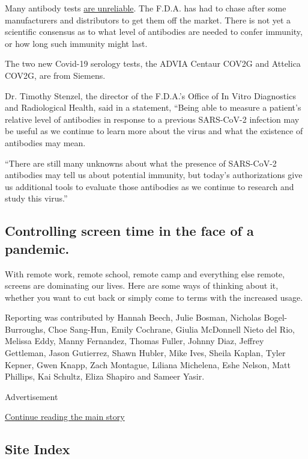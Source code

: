 Many antibody tests
\href{https://www.nytimes.com/2020/05/04/health/fda-antibody-tests-coronavirus.html}{are
unreliable}. The F.D.A. has had to chase after some manufacturers and
distributors to get them off the market. There is not yet a scientific
consensus as to what level of antibodies are needed to confer immunity,
or how long such immunity might last.

The two new Covid-19 serology tests, the ADVIA Centaur COV2G and
Attelica COV2G, are from Siemens.

Dr. Timothy Stenzel, the director of the F.D.A.'s Office of In Vitro
Diagnostics and Radiological Health, said in a statement, ``Being able
to measure a patient's relative level of antibodies in response to a
previous SARS-CoV-2 infection may be useful as we continue to learn more
about the virus and what the existence of antibodies may mean.

``There are still many unknowns about what the presence of SARS-CoV-2
antibodies may tell us about potential immunity, but today's
authorizations give us additional tools to evaluate those antibodies as
we continue to research and study this virus.''

\hypertarget{controlling-screen-time-in-the-face-of-a-pandemic}{%
\subsection{Controlling screen time in the face of a
pandemic.}\label{controlling-screen-time-in-the-face-of-a-pandemic}}

With remote work, remote school, remote camp and everything else remote,
screens are dominating our lives. Here are some ways of thinking about
it, whether you want to cut back or simply come to terms with the
increased usage.

Reporting was contributed by Hannah Beech, Julie Bosman, Nicholas
Bogel-Burroughs, Choe Sang-Hun, Emily Cochrane, Giulia McDonnell Nieto
del Rio, Melissa Eddy, Manny Fernandez, Thomas Fuller, Johnny Diaz,
Jeffrey Gettleman, Jason Gutierrez, Shawn Hubler, Mike Ives, Sheila
Kaplan, Tyler Kepner, Gwen Knapp, Zach Montague, Liliana Michelena, Eshe
Nelson, Matt Phillips, Kai Schultz, Eliza Shapiro and Sameer Yasir.

Advertisement

\protect\hyperlink{after-bottom}{Continue reading the main story}

\hypertarget{site-index}{%
\subsection{Site Index}\label{site-index}}

